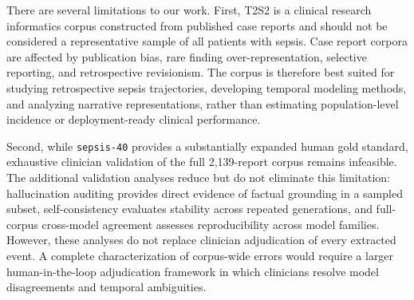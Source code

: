 \documentclass[pmlr,twocolumn,10pt]{jmlr} %
\begin{document}

There are several limitations to our work.
First, T2S2 is a clinical research informatics corpus constructed from published case reports and should not be considered a representative sample of all patients with sepsis.
Case report corpora are affected by publication bias, rare finding over-representation, selective reporting, and retrospective revisionism.
The corpus is therefore best suited for studying retrospective sepsis trajectories, developing temporal modeling methods, and analyzing narrative representations, rather than estimating population-level incidence or deployment-ready clinical performance.

Second, while \texttt{sepsis-40} provides a substantially expanded human gold standard, exhaustive clinician validation of the full 2,139-report corpus remains infeasible.
The additional validation analyses reduce but do not eliminate this limitation: hallucination auditing provides direct evidence of factual grounding in a sampled subset, self-consistency evaluates stability across repeated generations, and full-corpus cross-model agreement assesses reproducibility across model families.
However, these analyses do not replace clinician adjudication of every extracted event.
A complete characterization of corpus-wide errors would require a larger human-in-the-loop adjudication framework in which clinicians resolve model disagreements and temporal ambiguities.
\end{document}
